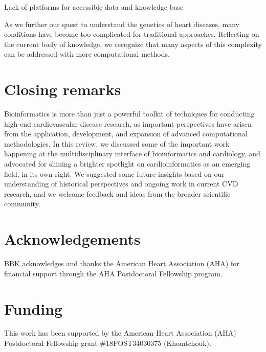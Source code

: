 \documentclass[letter]{bioinfo}
\begin{document}
	Lack of platforms for accessible data and knowledge base
	
	
	As we further our quest to understand the genetics of heart diseases, many conditions have become too complicated for traditional approaches. Reflecting on the current body of knowledge, we recognize that many aspects of this complexity can be addressed with more computational methods.
	
	
\section*{Closing remarks}
Bioinformatics is more than just a powerful toolkit of techniques for conducting high-end cardiovascular disease research, as important perspectives have arisen from the application, development, and expansion of advanced computational methodologies.  In this review, we discussed some of the important work happening at the multidisciplinary interface of bioinformatics and cardiology, and advocated for shining a brighter spotlight on cardioinformatics as an emerging field, in its own right.  We suggested some future insights based on our understanding of historical perspectives and ongoing work in current CVD research, and we welcome feedback and ideas from the broader scientific community.
	
	
	\enlargethispage{12pt}
	
	
	
	
	\section*{Acknowledgements}
	
	BBK acknowledges and thanks the American Heart Association (AHA) for financial support through the AHA Postdoctoral Fellowship program.
	\vspace*{-12pt}
	
	\section*{Funding}
	
	This work has been supported by the American Heart Association (AHA) Postdoctoral Fellowship grant \#18POST34030375 (Khomtchouk).\vspace*{-12pt}
	
	
	
	
	
	
\end{document}
